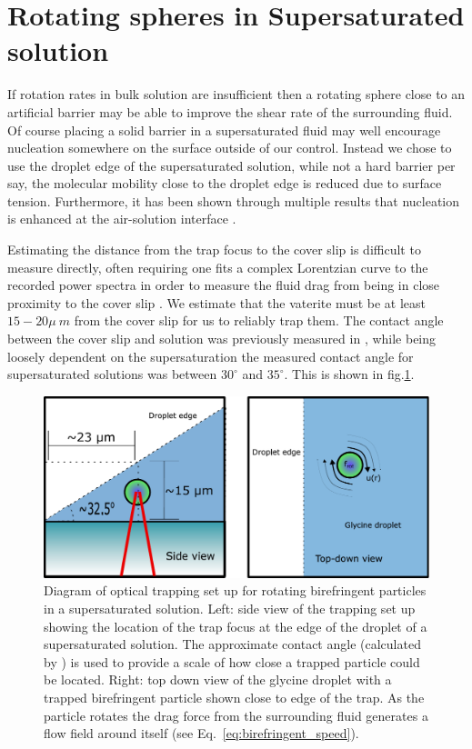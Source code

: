 \section{Rotating spheres in Supersaturated solution}
If rotation rates in bulk solution are insufficient then a 
rotating sphere close to an artificial barrier may be able 
to improve the shear rate of the surrounding fluid. Of course 
placing a solid barrier in a supersaturated fluid may well 
encourage nucleation somewhere on the surface outside of our 
control. Instead we chose to use the droplet edge of the 
supersaturated solution, while not a hard barrier per say, 
the molecular mobility close to the droplet edge is reduced 
due to surface tension. Furthermore, it has been shown through 
multiple results that nucleation is enhanced at the air-solution 
interface \cite{Liao2022,Yuyama2010, Sugiyama2009}. 

Estimating the distance from the trap focus to the cover slip
is difficult to measure directly, often requiring one fits a 
complex Lorentzian curve to the recorded power spectra in order 
to measure the fluid drag from being in close proximity to the 
cover slip \cite{BergSoerensen2004}. We estimate that the 
vaterite must be at least $15-20\mu\ m$ from the cover slip for 
us to reliably trap them. The contact angle between the cover 
slip and solution was previously measured in \cite{Flannigan2023},
while being loosely dependent on the supersaturation the 
measured contact angle for supersaturated solutions was between 
$30^{\circ}$ and $35^{\circ}$. This is shown in fig.\ref{fig:3.9}.
\begin{figure}[h!]
	\centering
	\includegraphics[width=\linewidth]{vaterite_diagram.pdf}
	\caption{Diagram of optical trapping set up for rotating 
		birefringent particles in a supersaturated solution. 
		Left: side view of the trapping set up showing the 
		location of the trap focus at the edge of the droplet 
		of a supersaturated solution. The approximate contact 
		angle (calculated by \cite{Flannigan2023}) is used to 
		provide a scale of how close a trapped particle could 
		be located. Right: top down view of the glycine droplet 
		with a trapped birefringent particle shown close to 
		edge of the trap. As the particle rotates the drag 
		force from the surrounding fluid generates a flow field 
		around itself (see Eq.~\ref{eq:birefringent_speed}).}
	\label{fig:3.9}
\end{figure}

